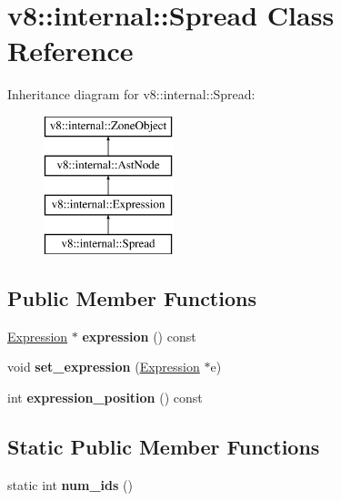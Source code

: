 \hypertarget{classv8_1_1internal_1_1_spread}{}\section{v8\+:\+:internal\+:\+:Spread Class Reference}
\label{classv8_1_1internal_1_1_spread}
Inheritance diagram for v8\+:\+:internal\+:\+:Spread\+:\begin{figure}[H]
\begin{center}
\leavevmode
\includegraphics[height=4.000000cm]{classv8_1_1internal_1_1_spread}
\end{center}
\end{figure}
\subsection*{Public Member Functions}
\begin{DoxyCompactItemize}
\item 
\hyperlink{classv8_1_1internal_1_1_expression}{Expression} $\ast$ {\bfseries expression} () const \hypertarget{classv8_1_1internal_1_1_spread_a80130324bb3d829cd7c85bf67ff93326}{}\label{classv8_1_1internal_1_1_spread_a80130324bb3d829cd7c85bf67ff93326}

\item 
void {\bfseries set\+\_\+expression} (\hyperlink{classv8_1_1internal_1_1_expression}{Expression} $\ast$e)\hypertarget{classv8_1_1internal_1_1_spread_a63827281754cf496c0e0671f2daef777}{}\label{classv8_1_1internal_1_1_spread_a63827281754cf496c0e0671f2daef777}

\item 
int {\bfseries expression\+\_\+position} () const \hypertarget{classv8_1_1internal_1_1_spread_a1eef5bf4efec456f962556cccdc97ad8}{}\label{classv8_1_1internal_1_1_spread_a1eef5bf4efec456f962556cccdc97ad8}

\end{DoxyCompactItemize}
\subsection*{Static Public Member Functions}
\begin{DoxyCompactItemize}
\item 
static int {\bfseries num\+\_\+ids} ()\hypertarget{classv8_1_1internal_1_1_spread_ac00a35b4fdfa8070b733d097f4220f58}{}\label{classv8_1_1internal_1_1_spread_ac00a35b4fdfa8070b733d097f4220f58}

\end{DoxyCompactItemize}
